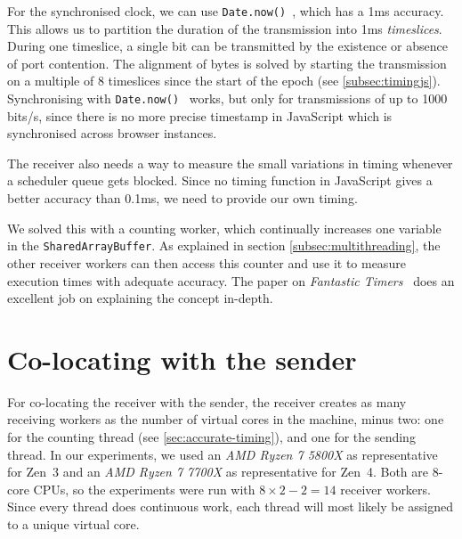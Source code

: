 \documentclass[11pt,
  titlepage=false,
]{scrreprt}
\begin{document}
For the synchronised clock, we can use \texttt{Date.now()}~\cite{datenow}, which has a 1ms accuracy.
This allows us to partition the duration of the transmission into 1ms \textit{timeslices}.
During one timeslice, a single bit can be transmitted by the existence or absence of port contention.
The alignment of bytes is solved by starting the transmission on a multiple of 8 timeslices since the start of the epoch (see \ref{subsec:timingjs}).
Synchronising with \texttt{Date.now()}~\cite{datenow} works, but only for transmissions of up to 1000 bits/s,
since there is no more precise timestamp in JavaScript which is synchronised across browser instances.


The receiver also needs a way to measure the small variations in timing whenever a scheduler queue gets blocked.
Since no timing function in JavaScript gives a better accuracy than 0.1ms, we need to provide our own timing.

We solved this with a counting worker, which continually increases one variable in the \texttt{SharedArrayBuffer}.
As explained in section \ref{subsec:multithreading}, the other receiver workers can then access this counter and use it to measure execution times with adequate accuracy.
The paper on \textit{Fantastic Timers}~\cite{Schwarz2017Timers} does an excellent job on explaining the concept in-depth.

\section{Co-locating with the sender}
\label{sec:co-location}
For co-locating the receiver with the sender, the receiver creates as many receiving workers as the number of virtual cores in the machine, minus two:
one for the counting thread (see \ref{sec:accurate-timing}), and one for the sending thread.
In our experiments, we used an \textit{AMD Ryzen 7 5800X} as representative for Zen~3 and an \textit{AMD Ryzen 7 7700X} as representative for Zen~4.
Both are 8-core CPUs, so the experiments were run with $8 \times 2 - 2 = 14$ receiver workers.
Since every thread does continuous work, each thread will most likely be assigned to a unique virtual core.
\end{document}
